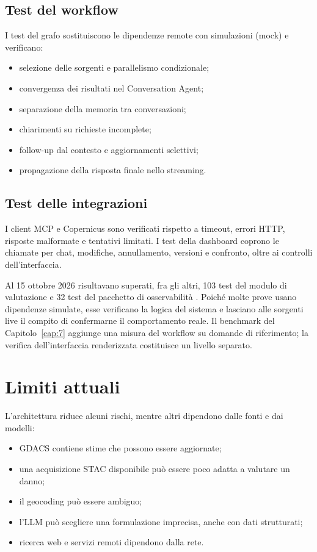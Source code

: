 \subsection{Test del workflow}

I test del grafo sostituiscono le dipendenze remote con simulazioni (mock) e
verificano:

\begin{itemize}
    \item selezione delle sorgenti e parallelismo condizionale;
    \item convergenza dei risultati nel Conversation Agent;
    \item separazione della memoria tra conversazioni;
    \item chiarimenti su richieste incomplete;
    \item follow-up dal contesto e aggiornamenti selettivi;
    \item propagazione della risposta finale nello streaming.
\end{itemize}

\subsection{Test delle integrazioni}

I client MCP e Copernicus sono verificati rispetto a timeout, errori HTTP,
risposte malformate e tentativi limitati. I test della dashboard coprono le
chiamate per chat, modifiche, annullamento, versioni e confronto, oltre ai
controlli dell'interfaccia.

Al 15 ottobre 2026 risultavano superati, fra gli altri, 103 test del modulo di
valutazione e 32 test del pacchetto di osservabilità \cite{guidaProgetto2026}.
Poiché molte prove usano dipendenze simulate, esse verificano la logica del
sistema e lasciano alle sorgenti live il compito di confermarne il
comportamento reale. Il benchmark del Capitolo~\ref{cap:7} aggiunge una misura
del workflow su domande di riferimento; la verifica dell'interfaccia
renderizzata costituisce un livello separato.

\section{Limiti attuali}

L'architettura riduce alcuni rischi, mentre altri dipendono dalle fonti e dai
modelli:

\begin{itemize}
    \item GDACS contiene stime che possono essere aggiornate;
    \item una acquisizione STAC disponibile può essere poco adatta a valutare
    un danno;
    \item il geocoding può essere ambiguo;
    \item l'LLM può scegliere una formulazione imprecisa, anche con dati
    strutturati;
    \item ricerca web e servizi remoti dipendono dalla rete.
\end{itemize}

